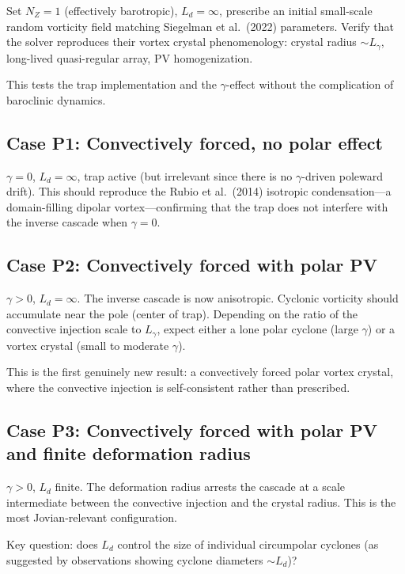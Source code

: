 \documentclass[11pt]{article}
\newcommand{\Ld}{L_d}
\begin{document}
Set $N_Z = 1$ (effectively barotropic), $\Ld = \infty$, prescribe an initial small-scale random vorticity field matching Siegelman et al.\ (2022) parameters. Verify that the solver reproduces their vortex crystal phenomenology: crystal radius $\sim L_\gamma$, long-lived quasi-regular array, PV homogenization.

This tests the trap implementation and the $\gamma$-effect without the complication of baroclinic dynamics.

\subsection{Case P1: Convectively forced, no polar effect}

$\gamma = 0$, $\Ld = \infty$, trap active (but irrelevant since there is no $\gamma$-driven poleward drift). This should reproduce the Rubio et al.\ (2014) isotropic condensation---a domain-filling dipolar vortex---confirming that the trap does not interfere with the inverse cascade when $\gamma = 0$.

\subsection{Case P2: Convectively forced with polar PV}

$\gamma > 0$, $\Ld = \infty$. The inverse cascade is now anisotropic. Cyclonic vorticity should accumulate near the pole (center of trap). Depending on the ratio of the convective injection scale to $L_\gamma$, expect either a lone polar cyclone (large $\gamma$) or a vortex crystal (small to moderate $\gamma$).

This is the first genuinely new result: a convectively forced polar vortex crystal, where the convective injection is self-consistent rather than prescribed.

\subsection{Case P3: Convectively forced with polar PV and finite deformation radius}

$\gamma > 0$, $\Ld$ finite. The deformation radius arrests the cascade at a scale intermediate between the convective injection and the crystal radius. This is the most Jovian-relevant configuration.

Key question: does $\Ld$ control the size of individual circumpolar cyclones (as suggested by observations showing cyclone diameters $\sim \Ld$)?
\end{document}
